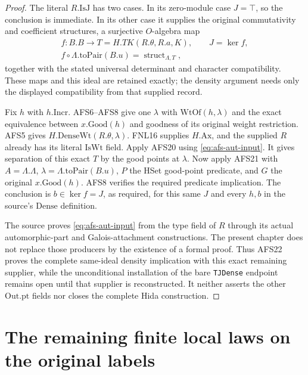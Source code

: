 \documentclass[11pt,a4paper]{article}
\numberwithin{equation}{section}
\theoremstyle{remark}\newtheorem{remark}[theorem]{Remark}
\begin{document}
\begin{proof}
The literal $R.\mathrm{IsJ}$ has two cases.  In its
zero-module case $J=\top$, so the conclusion is immediate.
In its other case it supplies the original commutativity
and coefficient structures, a surjective $O$-algebra map
\begin{gather*}
 f:B.B\longrightarrow T=H.TK(R.\theta,R.a,K),\qquad J=\ker f,\\
 f\circ\Lambda.\mathrm{toPair}(B.u)
                          =\operatorname{struct}_{\Lambda,T},
\end{gather*}
together with the stated universal determinant and
character compatibility.  These maps and this ideal
are retained exactly; the density argument needs only
the displayed compatibility from that supplied record.

Fix $h$ with $h.\mathrm{Incr}$.  AFS6--AFS8 give one
$\lambda$ with $\mathrm{WtOf}(h,\lambda)$ and the exact
equivalence between $x.\mathrm{Good}(h)$ and goodness
of its original weight restriction.  AFS5 gives
$H.\mathrm{DenseWt}(R.\theta,\lambda)$.
FNL16 supplies $H.\mathrm{Ax}$, and the supplied $R$
already has its literal $\mathrm{IsWt}$ field.
Apply AFS20 using \eqref{eq:afs-aut-input}.  It gives
separation of this exact $T$ by the good points at
$\lambda$.  Now apply AFS21 with
$A=\Lambda.\Lambda$, $\lambda=\Lambda.\mathrm{toPair}(B.u)$,
$P$ the HSet good-point predicate, and $G$ the original
$x.\mathrm{Good}(h)$.  AFS8 verifies the required
predicate implication.  The conclusion is
$b\in\ker f=J$, as required, for this same $J$ and
every $h,b$ in the source's $\mathrm{Dense}$ definition.

The source proves \eqref{eq:afs-aut-input} from the
type field of $R$ through its actual automorphic-part
and Galois-attachment constructions.  The present
chapter does not replace those producers by the
existence of a formal proof.  Thus AFS22 proves the
complete same-ideal density implication with this
exact remaining supplier, while the unconditional
installation of the bare \texttt{TJDense} endpoint
remains open until that supplier is reconstructed.
It neither asserts the other $\mathrm{Out.pt}$ fields
nor closes the complete Hida construction.
\end{proof}


\section{The remaining finite local laws on the original labels}
\label{sec:finite-local-completion-v43}
\end{document}
